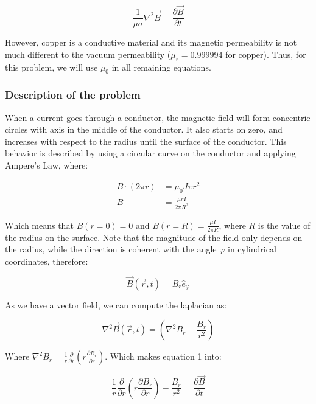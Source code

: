 \documentclass{article}
\begin{document}
\begin{equation}
\frac{1}{\mu \sigma} \nabla^2 \vec{B} = \frac{\partial \vec{B}}{\partial t}
\end{equation}

However, copper is a conductive material and its magnetic permeability is not much different to the vacuum permeability ($\mu_r = 0.999994$ for copper). Thus, for this problem, we will use $\mu_0$ in all remaining equations. 

\subsubsection{Description of the problem}

When a current goes through a conductor, the magnetic field will form concentric circles with axis in the middle of the conductor. It also starts on zero, and increases with respect to the radius until the surface of the conductor. This behavior is described by using a circular curve on the conductor and applying Ampere's Law, where:

\begin{align*}
B \cdot (2\pi r) &= \mu_0 J \pi r^2 \\
B &= \frac{\mu r I}{2 \pi R^2}
\end{align*}

Which means that $B(r=0) = 0$ and $B(r=R) = \frac{\mu I}{2 \pi R}$, where $R$ is the value of the radius on the surface. Note that the magnitude of the field only depends on the radius, while the direction is coherent with the angle $\varphi$ in cylindrical coordinates, therefore:

\begin{equation}
\vec{B}(\vec{r},t) = B_r \hat{e}_{\varphi}
\end{equation}

As we have a vector field, we can compute the laplacian as:

\begin{equation}
\nabla^2 \vec{B}(\vec{r},t) = \left(\nabla^2 B_{r} - \frac{B_r}{r^2} \right)
\end{equation}

Where $ \nabla^2 B_r = \frac{1}{r}\frac{\partial}{\partial r} \left( r \frac{\partial B_r}{\partial r}\right)$. Which makes equation 1 into:

\begin{equation}
\frac{1}{r}\frac{\partial}{\partial r} \left( r \frac{\partial B_r}{\partial r}\right)- \frac{B_r}{r^2} = \frac{\partial \vec{B}}{\partial t}
\end{equation}
\end{document}
